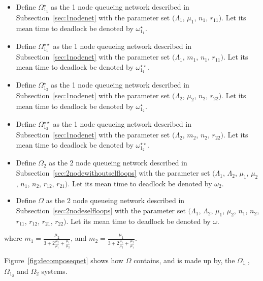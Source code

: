 \documentclass{article}
\numberwithin{equation}{section}
\begin{document}
\begin{itemize}
  \item Define $\Omega_{1_1}^{\star}$ as the 1 node queueing network described in Subsection~\ref{sec:1nodenet} with the parameter set $(\Lambda_1$, $\mu_1$, $n_1$, $r_{11})$. Let its mean time to deadlock be denoted by $\omega_{1_1}^{\star}$.
  \item Define $\Omega_{1_1}^{\star\star}$ as the 1 node queueing network described in Subsection~\ref{sec:1nodenet} with the parameter set $(\Lambda_1$, $m_1$, $n_1$, $r_{11})$. Let its mean time to deadlock be denoted by $\omega_{1_1}^{\star\star}$.
  \item Define $\Omega_{1_2}^{\star}$ as the 1 node queueing network described in Subsection~\ref{sec:1nodenet} with the parameter set $(\Lambda_2$, $\mu_2$, $n_2$, $r_{22})$. Let its mean time to deadlock be denoted by $\omega_{1_2}^{\star}$.
  \item Define $\Omega_{1_2}^{\star\star}$ as the 1 node queueing network described in Subsection~\ref{sec:1nodenet} with the parameter set $(\Lambda_2$, $m_2$, $n_2$, $r_{22})$. Let its mean time to deadlock be denoted by $\omega_{1_2}^{\star\star}$.
  \item Define $\Omega_2$ as the 2 node queueing network described in Subsection~\ref{sec:2nodewithoutselfloops} with the parameter set $(\Lambda_1$, $\Lambda_2$, $\mu_1$, $\mu_2$, $n_1$, $n_2$, $r_{12}$, $r_{21})$. Let its mean time to deadlock be denoted by $\omega_2$.
  \item Define $\Omega$ as the 2 node queueing network described in Subsection~\ref{sec:2nodeselfloops} with the parameter set $(\Lambda_1$, $\Lambda_2$, $\mu_1$, $\mu_2$, $n_1$, $n_2$, $r_{11}$, $r_{12}$, $r_{21}$, $r_{22})$. Let its mean time to deadlock be denoted by $\omega$.
\end{itemize}
where $m_1 = \frac{\mu_2}{3 + 2\frac{\mu_2}{\mu_1} + \frac{\mu_1}{\mu_2}}$, and $m_2 = \frac{\mu_1}{3 + 2\frac{\mu_1}{\mu_2} + \frac{\mu_2}{\mu_1}}$.

Figure~\ref{fig:decomposeqnet} shows how $\Omega$ contains, and is made up by, the $\Omega_{1_1}$, $\Omega_{1_2}$ and $\Omega_2$ systems.
\end{document}

